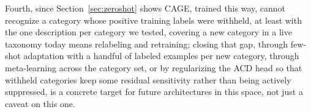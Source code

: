 Fourth, since Section~\ref{sec:zeroshot} shows CAGE, trained this way,
cannot recognize a category whose positive training labels were withheld, at least
with the one description per category we tested, covering a new category in a live taxonomy today means relabeling and
retraining; closing that gap,
through few-shot adaptation with a handful of labeled examples per new category,
through meta-learning across the category set, or by regularizing the ACD head so
that withheld categories keep some residual sensitivity rather than being actively
suppressed, is a concrete target for future architectures in this space, not just a
caveat on this one.
